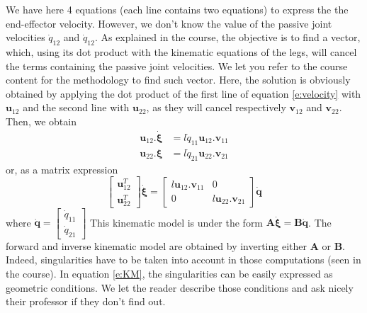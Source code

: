 \documentclass[a4paper]{article}
\begin{document}
We have here 4 equations (each line contains two equations) to express the the end-effector velocity. However, we don't know the value of the passive joint velocities $\dot{q}_{12}$ and $\dot{q}_{12}$. As explained in the course, the objective is to find a vector, which, using its dot product with the kinematic equations of the legs, will cancel the terms containing the passive joint velocities. We let you refer to the course content for the methodology to find such vector. Here, the solution is obviously obtained by applying the dot product of the first line of equation \eqref{e:velocity} with $\mathbf{u}_{12}$ and the second line with $\mathbf{u}_{22}$, as they will cancel respectively $\mathbf{v}_{12}$ and $\mathbf{v}_{22}$. Then, we obtain
\begin{equation}
    \begin{aligned}
        \mathbf{u}_{12}.\dot{\boldsymbol{\xi}} &= l\dot{q}_{11}\mathbf{u}_{12}.\mathbf{v}_{11}\\
        \mathbf{u}_{22}.\boldsymbol{\xi} &= l\dot{q}_{21}\mathbf{u}_{22}.\mathbf{v}_{21}
    \end{aligned}
\end{equation}
or, as a matrix expression
\begin{equation}
    \begin{bmatrix}
        \mathbf{u}_{12}^T\\
        \mathbf{u}_{22}^T
    \end{bmatrix}
    \dot{\boldsymbol{\xi}} = 
    \begin{bmatrix}
        l\mathbf{u}_{12}.\mathbf{v}_{11} & 0\\
        0 & l\mathbf{u}_{22}.\mathbf{v}_{21}
    \end{bmatrix}
    \dot{\mathbf{q}}
    \label{e:KM}
\end{equation}
where $\dot{\mathbf{q}}=\begin{bmatrix}
        \dot{q}_{11}\\
        \dot{q}_{21}
    \end{bmatrix}$
This kinematic model is under the form $\mathbf{A}\dot{\boldsymbol{\xi}}=\mathbf{B}\dot{\mathbf{q}}$. The forward and inverse kinematic model are obtained by inverting either $\mathbf{A}$ or $\mathbf{B}$. Indeed, singularities have to be taken into account in those computations (seen in the course). In equation \eqref{e:KM}, the singularities can be easily expressed as geometric conditions. We let the reader describe those conditions and ask nicely their professor if they don't find out.
%
\end{document}
